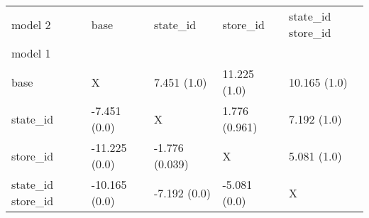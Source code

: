 \begin{tabular}{lllll}
\toprule
model 2 & base & state_id & store_id & state_id store_id \\
model 1 &  &  &  &  \\
\midrule
base & X & 7.451 (1.0) & 11.225 (1.0) & 10.165 (1.0) \\
state_id & \cellcolor{green} -7.451 (0.0) & X & 1.776 (0.961) & 7.192 (1.0) \\
store_id & \cellcolor{green} -11.225 (0.0) & \cellcolor{green} -1.776 (0.039) & X & 5.081 (1.0) \\
state_id store_id & \cellcolor{green} -10.165 (0.0) & \cellcolor{green} -7.192 (0.0) & \cellcolor{green} -5.081 (0.0) & X \\
\bottomrule
\end{tabular}
